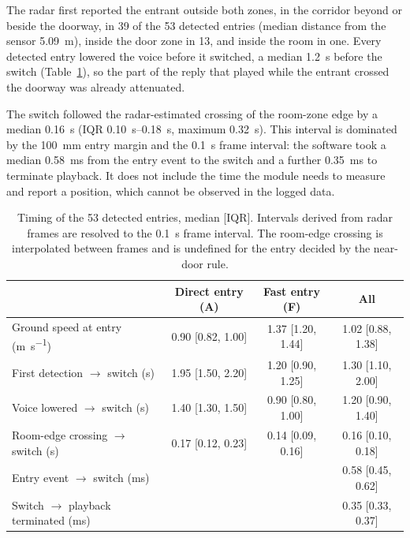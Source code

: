 The radar first reported the entrant outside both zones, in the corridor beyond
or beside the doorway, in 39 of the 53 detected entries (median distance from
the sensor \SI{5.09}{\metre}), inside the door zone in 13, and inside the room
in one. Every detected entry lowered the voice before it switched, a median
\SI{1.2}{\second} before the switch (Table~\ref{tab:ps-timing}), so the part of
the reply that played while the entrant crossed the doorway was already
attenuated.

The switch followed the radar-estimated crossing of the room-zone edge by a
median \SI{0.16}{\second} (IQR \SIrange{0.10}{0.18}{\second}, maximum
\SI{0.32}{\second}). This interval is dominated by the \SI{100}{\milli\metre}
entry margin and the \SI{0.1}{\second} frame interval: the software took a
median \SI{0.58}{\milli\second} from the entry event to the switch and a
further \SI{0.35}{\milli\second} to terminate playback. It does not include
the time the module needs to measure and report a position, which cannot be
observed in the logged data.

\begin{table}[htbp]
  \centering
  \small
  \caption{Timing of the 53 detected entries, median [IQR]. Intervals derived
  from radar frames are resolved to the \SI{0.1}{\second} frame interval. The
  room-edge crossing is interpolated between frames and is undefined for the
  entry decided by the near-door rule.}
  \label{tab:ps-timing}
  \begin{tabular}{lccc}
    \toprule
    & Direct entry (A) & Fast entry (F) & All \\
    \midrule
    Ground speed at entry (\si{\metre\per\second})
      & 0.90 [0.82, 1.00] & 1.37 [1.20, 1.44] & 1.02 [0.88, 1.38] \\
    First detection $\to$ switch (\si{\second})
      & 1.95 [1.50, 2.20] & 1.20 [0.90, 1.25] & 1.30 [1.10, 2.00] \\
    Voice lowered $\to$ switch (\si{\second})
      & 1.40 [1.30, 1.50] & 0.90 [0.80, 1.00] & 1.20 [0.90, 1.40] \\
    Room-edge crossing $\to$ switch (\si{\second})
      & 0.17 [0.12, 0.23] & 0.14 [0.09, 0.16] & 0.16 [0.10, 0.18] \\
    \addlinespace
    Entry event $\to$ switch (\si{\milli\second})
      & & & 0.58 [0.45, 0.62] \\
    Switch $\to$ playback terminated (\si{\milli\second})
      & & & 0.35 [0.33, 0.37] \\
    \bottomrule
  \end{tabular}
\end{table}

